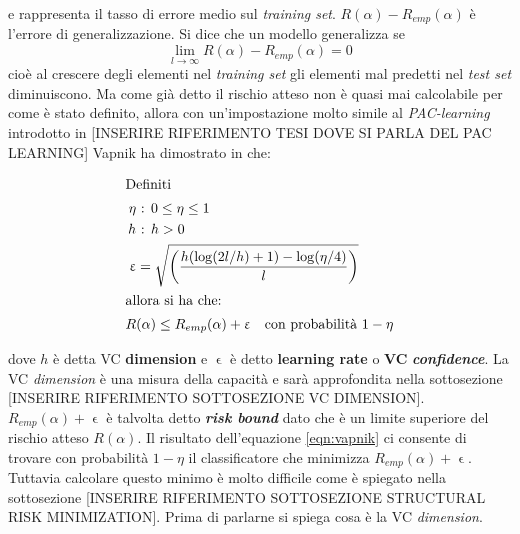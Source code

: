 e rappresenta il tasso di errore medio sul \textit{training set}. $R(\alpha) - R_{emp}(\alpha)$ è l'errore di generalizzazione. Si dice che un modello generalizza se
\begin{equation*}
\lim_{ l \to \infty} R(\alpha) - R_{emp}(\alpha) = 0
\end{equation*}   
cioè al crescere degli elementi nel \textit{training set} gli elementi mal predetti nel \textit{test set} diminuiscono. Ma come già detto il rischio atteso non è quasi mai calcolabile per come è stato definito, allora con un'impostazione molto simile al \textit{PAC-learning} introdotto in [INSERIRE RIFERIMENTO TESI DOVE SI PARLA DEL PAC LEARNING] Vapnik ha dimostrato in \cite{Vapnik95}  che:

\begin{align}
  \intertext{Definiti} 
  \eta &\text{ : } 0 \leq \eta \leq 1 \notag \\ 
  h &\text{ : } h > 0 \\
  \upvarepsilon &= \sqrt{\biggl(\frac{h(\log (2l/h) + 1) - \log (\eta/4)}{l}\biggl)}\\ \intertext{allora si ha che:} 
  R&(\alpha) \leq R_{emp}(\alpha) +\upvarepsilon \quad \text{con probabilità }1-\eta \label{eqn:vapnik}
\end{align}

dove $h$ è detta \ac{VC} \textbf{dimension} e $\upvarepsilon$ è detto \textbf{learning rate} o \textbf{\ac{VC}} \textbf{\textit{confidence}}. La \ac{VC} \textit{dimension} è una misura della capacità e sarà approfondita nella sottosezione [INSERIRE RIFERIMENTO SOTTOSEZIONE VC DIMENSION].  $R_{emp}(\alpha) +\upvarepsilon$ è talvolta detto \textbf{\textit{risk bound}} dato che è un limite superiore del rischio atteso $R(\alpha)$.  Il risultato dell'equazione \eqref{eqn:vapnik} ci consente di trovare con probabilità $1-\eta$ il classificatore che minimizza $R_{emp}(\alpha) +\upvarepsilon$. Tuttavia calcolare questo minimo è molto difficile come è spiegato nella sottosezione [INSERIRE RIFERIMENTO SOTTOSEZIONE STRUCTURAL RISK MINIMIZATION]. Prima di parlarne si spiega cosa è la \ac{VC} \textit{dimension}.

